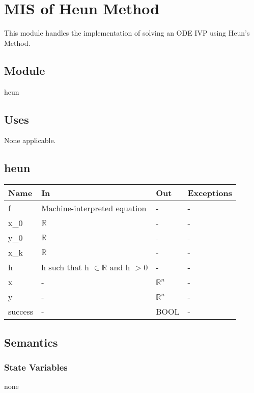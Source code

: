 \documentclass[12pt, titlepage]{article}
\begin{document}
\newpage

\section{MIS of Heun Method} \label{modHeun}
This module handles the implementation of solving an ODE IVP using Heun's Method. 

\subsection{Module}
heun

\subsection{Uses}

None applicable.

\subsection{heun}

\begin{center}
\begin{tabular}{p{4cm} p{4cm} p{4cm} p{2cm}}
\hline
\textbf{Name} & \textbf{In} & \textbf{Out} & \textbf{Exceptions} \\
\hline
f & Machine-interpreted equation & - & -\\
x\_0 & $\mathbb{R}$ & - & -\\
y\_0 & $\mathbb{R}$ & - & -\\
x\_k & $\mathbb{R}$ & - & -\\
h & h such that h $\in \mathbb{R}$ and h $> 0$ & - & -\\
x & - & $\mathbb{R}^n$ & - \\
y & - & $\mathbb{R}^n$ & - \\
success & - & BOOL & - \\
\hline
\end{tabular}
\end{center}

\subsection{Semantics}

\subsubsection{State Variables}
none

\newpage
\end{document}
